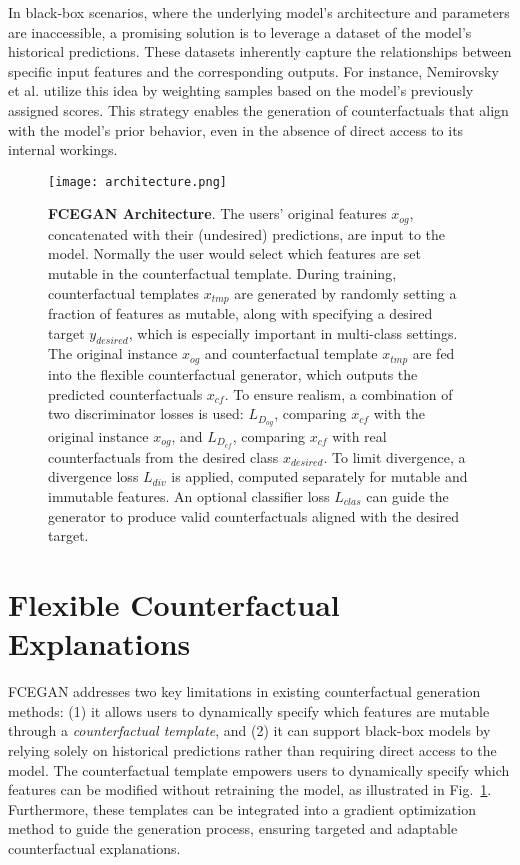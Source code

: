 \documentclass[runningheads]{llncs}
\begin{document}
In black-box scenarios, where the underlying model's architecture and parameters are inaccessible, a promising solution is to leverage a dataset of the model's historical predictions. These datasets inherently capture the relationships between specific input features and the corresponding outputs. For instance, Nemirovsky et al.\cite{nemirovsky_2022_countergan} utilize this idea by weighting samples based on the model's previously assigned scores. This strategy enables the generation of counterfactuals that align with the model's prior behavior, even in the absence of direct access to its internal workings.

\begin{figure}[t!]
    \centering
    \texttt{[image: architecture.png]}
    \caption{\textbf{FCEGAN Architecture}. The users' original features \(x_{og}\), concatenated with their (undesired) predictions, are input to the model. Normally the user would select which features are set mutable in the counterfactual template. During training, counterfactual templates \( x_{tmp} \) are generated by randomly setting a fraction of features as mutable, along with specifying a desired target \( y_{desired} \), which is especially important in multi-class settings. The original instance \( x_{og} \) and counterfactual template \( x_{tmp} \) are fed into the flexible counterfactual generator, which outputs the predicted counterfactuals \( x_{cf} \). To ensure realism, a combination of two discriminator losses is used: \( L_{D_{og}} \), comparing \( x_{cf} \) with the original instance \( x_{og} \), and \( L_{D_{cf}} \), comparing \( x_{cf} \) with real counterfactuals from the desired class \( x_{desired} \). To limit divergence, a divergence loss \( L_{div} \) is applied, computed separately for mutable and immutable features. An optional classifier loss \( L_{clas} \) can guide the generator to produce valid counterfactuals aligned with the desired target.}
    \label{fig:architecture}
\end{figure}

\section{Flexible Counterfactual Explanations}
\label{sec:methodology}

FCEGAN addresses two key limitations in existing counterfactual generation methods: (1) it allows users to dynamically specify which features are mutable through a \textit{counterfactual template}, and (2) it can support black-box models by relying solely on historical predictions rather than requiring direct access to the model. The counterfactual template empowers users to dynamically specify which features can be modified without retraining the model, as illustrated in Fig.~\ref{fig:architecture}. Furthermore, these templates can be integrated into a gradient optimization method to guide the generation process, ensuring targeted and adaptable counterfactual explanations.
\end{document}
